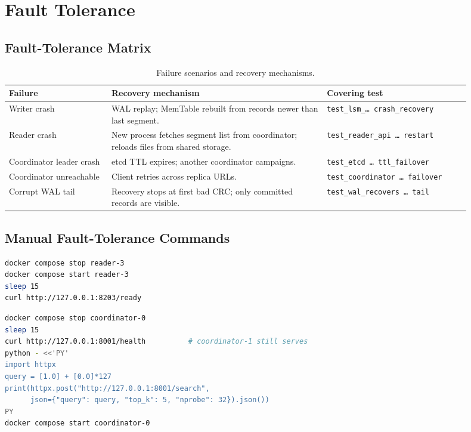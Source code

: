 \documentclass[11pt,a4paper]{article}
\begin{document}
\section{Fault Tolerance}

\subsection{Fault-Tolerance Matrix}

\begin{table}[H]
\centering
\caption{Failure scenarios and recovery mechanisms.}
\renewcommand{\arraystretch}{1.3}
\begin{tabular}{p{0.20\linewidth} p{0.42\linewidth} p{0.28\linewidth}}
\toprule
\textbf{Failure} & \textbf{Recovery mechanism} & \textbf{Covering test} \\
\midrule
Writer crash &
  WAL replay; MemTable rebuilt from records newer than last segment. &
  \small\texttt{test\_lsm\_\ldots{} crash\_recovery} \\
Reader crash &
  New process fetches segment list from coordinator; reloads files from shared storage. &
  \small\texttt{test\_reader\_api \ldots{} restart} \\
Coordinator leader crash &
  etcd TTL expires; another coordinator campaigns. &
  \small\texttt{test\_etcd \ldots{} ttl\_failover} \\
Coordinator unreachable &
  Client retries across replica URLs. &
  \small\texttt{test\_coordinator \ldots{} failover} \\
Corrupt WAL tail &
  Recovery stops at first bad CRC; only committed records are visible. &
  \small\texttt{test\_wal\_recovers \ldots{} tail} \\
\bottomrule
\end{tabular}
\end{table}

\subsection{Manual Fault-Tolerance Commands}

\begin{lstlisting}[language=bash, caption={Reader restart check.}]
docker compose stop reader-3
docker compose start reader-3
sleep 15
curl http://127.0.0.1:8203/ready
\end{lstlisting}

\begin{lstlisting}[language=bash, caption={Coordinator failover check.}]
docker compose stop coordinator-0
sleep 15
curl http://127.0.0.1:8001/health          # coordinator-1 still serves
python - <<'PY'
import httpx
query = [1.0] + [0.0]*127
print(httpx.post("http://127.0.0.1:8001/search",
      json={"query": query, "top_k": 5, "nprobe": 32}).json())
PY
docker compose start coordinator-0
\end{lstlisting}
\end{document}
